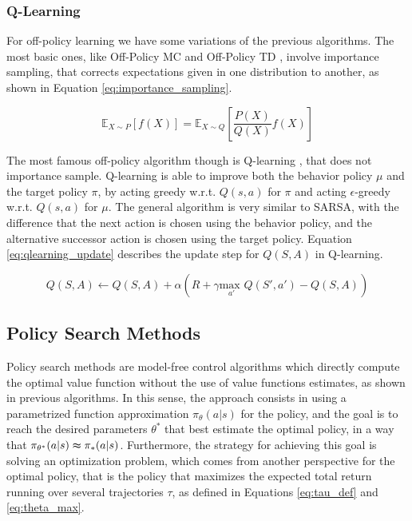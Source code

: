 
\subsubsection{Q-Learning}

For off-policy learning we have some variations of the previous algorithms. The most basic ones, like Off-Policy MC and Off-Policy TD \cite{Sutton1998}, involve importance sampling, that corrects expectations given in one distribution to another, as shown in Equation \eqref{eq:importance_sampling}.

\begin{equation}
\mathbb{E}_{X \sim P}[f(X)] = \mathbb{E}_{X \sim Q}\left[\frac{P(X)}{Q(X)}f(X)\right]
\label{eq:importance_sampling}
\end{equation}

The most famous off-policy algorithm though is Q-learning \cite{QLearning}, that does not importance sample. Q-learning is able to improve both the behavior policy $\mu$ and the target policy $\pi$, by acting greedy w.r.t. $Q(s,a)$ for $\pi$ and acting $\epsilon$-greedy w.r.t. $Q(s,a)$ for $\mu$. The general algorithm is very similar to SARSA, with the difference that the next action is chosen using the behavior policy, and the alternative successor action is chosen using the target policy. Equation \eqref{eq:qlearning_update} describes the update step for $Q(S,A)$ in Q-learning.

\begin{equation}
Q(S,A) \leftarrow Q(S,A) + \alpha (R + \gamma \underset{a'}{\textrm{max }}Q(S',a') - Q(S,A))
\label{eq:qlearning_update}
\end{equation}

\subsection{Policy Search Methods}

Policy search methods are model-free control algorithms which directly compute the optimal value function without the use of value functions estimates, as shown in previous algorithms. In this sense, the approach consists in using a parametrized function approximation $\pi_{\theta}(a|s)$ for the policy, and the goal is to reach the desired parameters $\theta^*$ that best estimate the optimal policy, in a way that $\pi_{\theta^*}(a|s) \thickapprox \pi_*(a|s)$. Furthermore, the strategy for achieving this goal is solving an optimization problem, which comes from another perspective for the optimal policy, that is the policy that maximizes the expected total return running over several trajectories $\tau$, as defined in Equations \eqref{eq:tau_def} and \eqref{eq:theta_max}.

